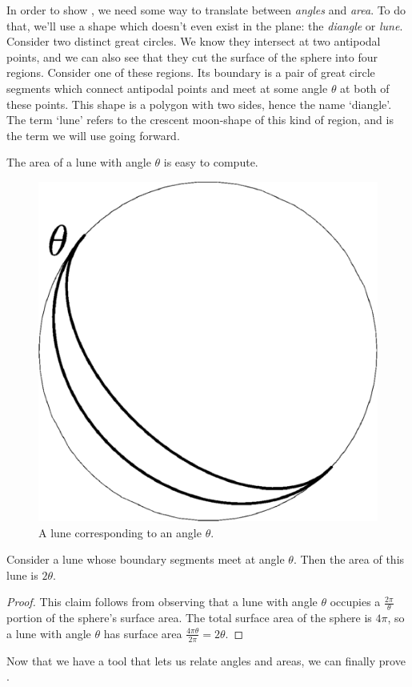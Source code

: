 In order to  show , we need some way to translate between \textit{angles} and \textit{area}.  To do that, we'll use a shape which doesn't even exist in the plane: the \textit{diangle} or \textit{lune}.  Consider two distinct great circles.  We know they intersect at two antipodal points, and we can also see that they cut the surface of the sphere into four regions.  Consider one of these regions.  Its boundary is a pair of great circle segments which connect antipodal points and meet at some angle $\theta$ at both of these points.  This shape is a polygon with two sides, hence the name `diangle'.  The term `lune' refers to the crescent moon-shape of this kind of region, and is the term we will use going forward.  

The area of a lune with angle $\theta$ is easy to compute.


\begin{figure}[htb]
	\centering
	\includegraphics[width=.35\textwidth]{figs/lune.pdf}
	\caption{A lune corresponding to an angle $\theta$. }
	\label{fig:lune}
\end{figure}

\begin{claim}
	Consider a lune whose boundary segments meet at angle $\theta$.  Then the area of this lune is $2\theta$.
\end{claim}
\begin{proof}
	This claim follows from observing that a lune with angle $\theta$ occupies a $\tfrac{2\pi}{\theta}$ portion of the sphere's surface area.  The total surface area of the sphere is $4\pi$, so a lune with angle $\theta$ has surface area $\tfrac{4\pi\theta}{2\pi}= 2\theta$.
\end{proof}

Now that we have a tool that lets us relate angles and areas, we can finally prove .










